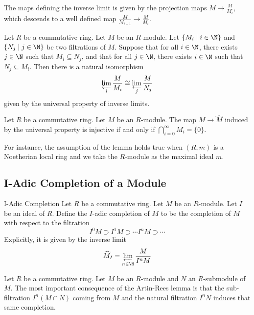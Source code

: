 \documentclass[a4paper]{article}
\begin{document}
The maps defining the inverse limit is given by the projection maps $M\to\frac{M}{M_i}$, which descends to a well defined map $\frac{M}{M_{i+1}}\to\frac{M}{M_i}$. 

\begin{lmm}{}{} Let $R$ be a commutative ring. Let $M$ be an $R$-module. Let $\{M_i\;|\;i\in\N\}$ and $\{N_j\;|\;j\in\N\}$ be two filtrations of $M$. Suppose that for all $i\in\N$, there exists $j\in\N$ such that $M_i\subseteq N_j$, and that for all $j\in\N$, there exists $i\in\N$ such that $N_j\subseteq M_i$. Then there is a natural isomorphism $$\varprojlim_i\frac{M}{M_i}\cong\varprojlim_j\frac{M}{N_j}$$ given by the universal property of inverse limits. 
\end{lmm}

\begin{lmm}{}{} Let $R$ be a commutative ring. Let $M$ be an $R$-module. The map $M\to\widehat{M}$ induced by the universal property is injective if and only if $\bigcap_{i=0}^\infty M_i=\{0\}$. 
\end{lmm}

For instance, the assumption of the lemma holds true when $(R,m)$ is a Noetherian local ring and we take the $R$-module as the maximal ideal $m$. 

\subsection{I-Adic Completion of a Module}
\begin{defn}{I-Adic Completion}{} Let $R$ be a commutative ring. Let $M$ be an $R$-module. Let $I$ be an ideal of $R$. Define the $I$-adic completion of $M$ to be the completion of $M$ with respect to the filtration $$I^0M\supset I^1M\supset\cdots I^nM\supset\cdots$$ Explicitly, it is given by the inverse limit $$\widehat{M}_I=\varprojlim_{n\in\N}\frac{M}{I^nM}$$
\end{defn}

Let $R$ be a commutative ring. Let $M$ be an $R$-module and $N$ an $R$-submodule of $M$. The most important consequence of the Artin-Rees lemma is that the sub-filtration $I^n(M\cap N)$ coming from $M$ and the natural filtration $I^nN$ induces that same completion. 
\end{document}

